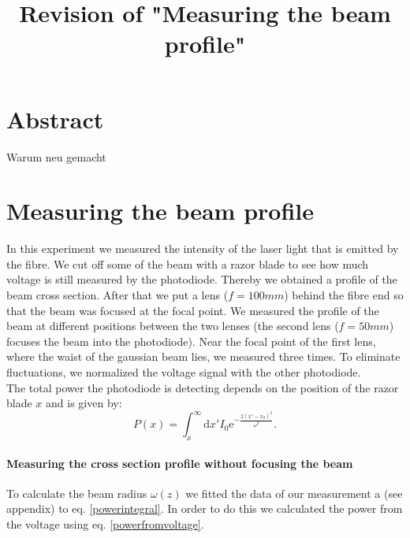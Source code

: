 \documentclass{article}
\title{Revision of "Measuring the beam profile"}
\begin{document}
\maketitle
\section{Abstract} 
Warum neu gemacht

\section{Measuring the beam profile}

In this experiment we measured the intensity of the laser light that is emitted by the fibre. We cut off some of the beam with a razor blade to see how much voltage is still measured by the photodiode. Thereby we obtained a profile of the beam cross section. After that we put a lens ($f=100mm$) behind the fibre end so that the beam was focused at the focal point. We measured the profile of the beam at different positions between the two lenses (the second lens ($f=50mm$) focuses the beam into the photodiode). Near the focal point of the first lens, where the waist of the gaussian beam lies, we measured three times. To eliminate fluctuations, we normalized the voltage signal with the other photodiode.\\

The total power the photodiode is detecting depends on the position of the razor blade $x$ and is given by:
\begin{equation}
P(x) = \int_x^\infty\mathrm{d}x' I_0 \mathrm{e}^{-\frac{2(x'-x_0)^2}{\omega^2}}.
\label{powerintegral}
\end{equation}


\paragraph{Measuring the cross section profile without focusing the beam}

To calculate the beam radius $\omega (z)$ we fitted the data of our measurement a (see appendix) to eq. \ref{powerintegral}. In order to do this we calculated the power from the voltage using eq. \ref{powerfromvoltage}. \\
\end{document}
